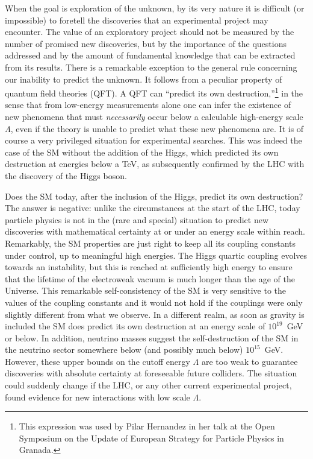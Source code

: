 \documentclass[../report.tex]{subfiles}
\begin{document}
When the goal is exploration of the unknown, by its very nature it is difficult (or impossible) to foretell the discoveries that an experimental project may encounter. The value of an exploratory project should not be measured by the number of promised new discoveries, but by the importance of the questions addressed and by the amount of fundamental knowledge that can be extracted from its results.
There is a remarkable exception to the general rule concerning our inability to predict the unknown.
 It follows from a peculiar property of quantum field theories (QFT). A QFT can ``predict its own destruction,''\footnote{This expression was used by Pilar Hernandez in her talk at the Open Symposium on the Update of European Strategy for Particle Physics in Granada.} in the sense that from low-energy measurements alone one can infer the existence of new phenomena that must {\it necessarily} occur below a calculable high-energy scale $\Lambda$, even if the theory is unable to predict what these new phenomena are. It is of course a very privileged situation for experimental searches.  
 This was indeed the case of the SM without the addition of the Higgs, which predicted its own destruction at energies below a TeV, as subsequently confirmed by the LHC with the discovery of the Higgs boson. 
 
 Does the SM today, after the inclusion of the Higgs, predict its own destruction?  The answer is negative: unlike the circumstances at the start of the LHC, today particle physics is not in the (rare and special) situation to predict new discoveries  with mathematical certainty at or under an energy scale within reach.  
 Remarkably, the SM properties are just right to keep all its coupling constants under control, up to meaningful high energies. The Higgs quartic coupling evolves towards an instability, but this is reached at sufficiently high energy to ensure that the lifetime of the electroweak vacuum is much longer than the age of the Universe. This remarkable self-consistency of the SM is very sensitive to the values of the coupling constants and it would not hold if the couplings were only slightly different from what we observe.  In a different realm, as soon as gravity is included the SM does predict its own destruction at an energy scale of $10^{19}$~GeV or below. In addition, neutrino masses suggest the self-destruction of the SM in the neutrino sector somewhere below (and possibly much below) $10^{15}$~GeV. However, these upper bounds on the cutoff energy $\Lambda$ are too weak to guarantee discoveries with absolute certainty at foreseeable future colliders. The situation could suddenly change if the LHC, or any other current experimental project, found evidence for new 
 interactions with low scale $\Lambda$.   
\end{document}
